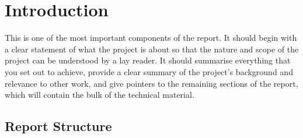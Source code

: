 \chapter{Introduction}
This is one of the most important components of the report. It should begin with a clear statement
of what the project is about so that the nature and scope of the project can be understood by a lay
reader. It should summarise everything that you set out to achieve, provide a clear summary of the
project's background and relevance to other work, and give pointers to the remaining sections of the
report, which will contain the bulk of the technical material.

\section{Report Structure}

